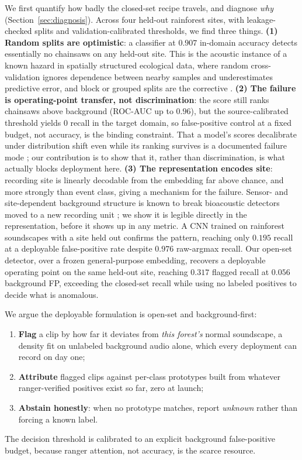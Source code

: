 We first quantify how badly the closed-set recipe travels, and diagnose
\emph{why} (Section~\ref{sec:diagnosis}). Across four held-out rainforest sites,
with leakage-checked splits and validation-calibrated thresholds, we find three
things. \textbf{(1) Random splits are optimistic}: a classifier at $0.907$
in-domain accuracy detects essentially no chainsaws on any held-out site. This is
the acoustic instance of a known hazard in spatially structured ecological data,
where random cross-validation ignores dependence between nearby samples and
underestimates predictive error, and block or grouped splits are the corrective
\citep{roberts2017crossval}.
\textbf{(2) The failure is operating-point transfer, not discrimination}: the
score still ranks chainsaws above background (ROC-AUC up to $0.96$), but the
source-calibrated threshold yields $0$ recall in the target domain, so
false-positive control at a fixed budget, not accuracy, is the binding
constraint. That a model's scores decalibrate under distribution shift even while
its ranking survives is a documented failure mode
\citep{snoek2019shift}; our contribution is to show that it, rather than
discrimination, is what actually blocks deployment here. \textbf{(3) The representation encodes site}: recording site is
linearly decodable from the embedding far above chance, and more strongly than
event class, giving a mechanism for the failure. Sensor- and site-dependent
background structure is known to break bioacoustic detectors moved to a new
recording unit \citep{lostanlen2019robust}; we show it is legible directly in
the representation, before it shows up in any metric. A CNN trained on rainforest
soundscapes with a site held out confirms the pattern, reaching only $0.195$
recall at a deployable false-positive rate despite $0.976$ raw-argmax recall.
Our open-set detector, over a frozen general-purpose embedding, recovers a
deployable operating point on the same held-out site, reaching $0.317$ flagged recall
at $0.056$ background FP, exceeding the closed-set recall while using no labeled
positives to decide what is anomalous.

We argue the deployable formulation is open-set and background-first:
\begin{enumerate}
\item \textbf{Flag} a clip by how far it deviates from \emph{this forest's}
      normal soundscape, a density fit on unlabeled background audio alone,
      which every deployment can record on day one;
\item \textbf{Attribute} flagged clips against per-class prototypes built from
      whatever ranger-verified positives exist so far, zero at launch;
\item \textbf{Abstain honestly}: when no prototype matches, report
      \emph{unknown} rather than forcing a known label.
\end{enumerate}
The decision threshold is calibrated to an explicit background false-positive
budget, because ranger attention, not accuracy, is the scarce resource.

